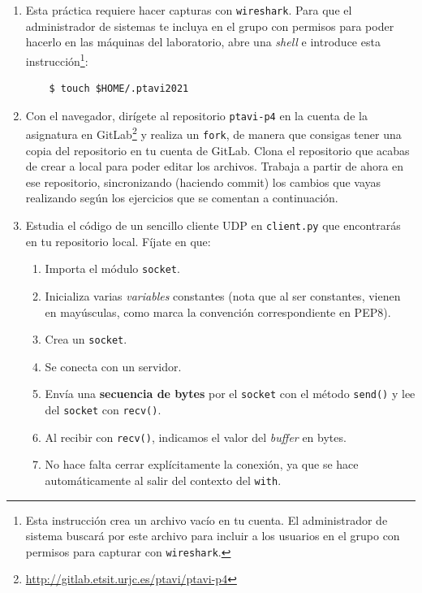 \documentclass[11pt,a4paper]{article}
\begin{document}
\begin{enumerate}

  \item Esta práctica requiere hacer capturas con \texttt{wireshark}. Para que el administrador de sistemas te incluya en el grupo con permisos para poder hacerlo en las máquinas del laboratorio, abre una \emph{shell} e introduce esta instrucción\footnote{Esta instrucción crea un archivo vacío en tu cuenta. El administrador de sistema buscará por este archivo para incluir a los usuarios en el grupo con permisos para capturar con \texttt{wireshark}.}:
    \begin{verbatim}
	$ touch $HOME/.ptavi2021
    \end{verbatim}

  \item Con el navegador, dirígete al repositorio \texttt{ptavi-p4} en la cuenta de la asignatura en GitLab\footnote{\url{http://gitlab.etsit.urjc.es/ptavi/ptavi-p4}} y realiza un \texttt{fork}, de manera que consigas tener una copia del repositorio en tu cuenta de GitLab. Clona el repositorio que acabas de crear a local para poder editar los archivos. Trabaja a partir de ahora en ese repositorio, sincronizando (haciendo commit) los cambios que vayas realizando según los ejercicios que se comentan a continuación.

  \item Estudia el código de un sencillo cliente UDP en \texttt{client.py} que encontrarás en tu repositorio local. Fíjate en que:
  \begin{enumerate}
    \item Importa el módulo \texttt{socket}.
    \item Inicializa varias \emph{variables} constantes (nota que al ser constantes, vienen en mayúsculas, como marca la convención correspondiente en PEP8).
    \item Crea un \texttt{socket}.
    \item Se conecta con un servidor.
    \item Envía una {\bf secuencia de bytes} por el \texttt{socket} con el método \texttt{send()} y lee del \texttt{socket} con \texttt{recv()}.
    \item Al recibir con \texttt{recv()}, indicamos el valor del \emph{buffer} en bytes.
    \item No hace falta cerrar explícitamente la conexión, ya que se hace automáticamente al salir del contexto del \texttt{with}.
  \end{enumerate}



\end{enumerate}
\end{document}

